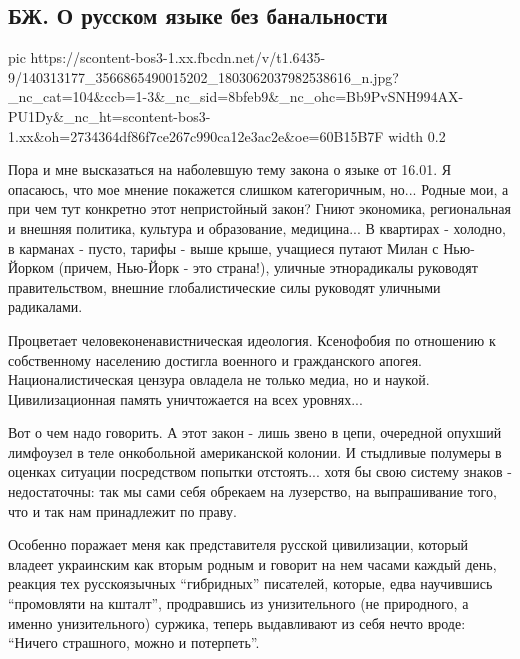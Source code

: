  
 
 
 
 

\subsection{БЖ. О русском языке без банальности}
\label{sec:18_01_2021.fb.bilchenko_evgenia.1.mova_jazyk}

\ifcmt
  pic https://scontent-bos3-1.xx.fbcdn.net/v/t1.6435-9/140313177_3566865490015202_1803062037982538616_n.jpg?_nc_cat=104&ccb=1-3&_nc_sid=8bfeb9&_nc_ohc=Bb9PvSNH994AX-PU1Dy&_nc_ht=scontent-bos3-1.xx&oh=2734364df86f7ce267c990ca12e3ac2e&oe=60B15B7F
	width 0.2
\fi

Пора и мне высказаться на наболевшую тему закона о языке от 16.01. Я опасаюсь,
что мое мнение покажется слишком категоричным, но... Родные мои, а при чем тут
конкретно этот непристойный закон? Гниют экономика, региональная и внешняя
политика, культура и образование, медицина... В квартирах - холодно, в карманах
- пусто, тарифы - выше крыше, учащиеся путают Милан с Нью-Йорком (причем,
Нью-Йорк - это страна!), уличные этнорадикалы руководят правительством, внешние
глобалистические силы руководят уличными радикалами.  

Процветает человеконенавистническая идеология. Ксенофобия по отношению к
собственному населению достигла военного и гражданского апогея.
Националистическая цензура овладела не только медиа, но и наукой.
Цивилизационная память уничтожается на всех уровнях...

Вот о чем надо говорить. А этот закон - лишь звено в цепи, очередной опухший
лимфоузел в теле онкобольной американской колонии. И стыдливые полумеры в
оценках ситуации посредством попытки отстоять... хотя бы свою систему знаков -
недостаточны: так мы сами себя обрекаем на лузерство, на выпрашивание того, что
и так нам принадлежит по праву.

Особенно поражает меня как представителя русской цивилизации, который владеет
украинским как вторым родным и говорит на нем часами каждый день, реакция тех
русскоязычных \enquote{гибридных} писателей, которые, едва научившись \enquote{промовляти на
кшталт},  продравшись из унизительного (не природного, а именно унизительного)
суржика, теперь выдавливают из себя нечто вроде: \enquote{Ничего страшного, можно и
потерпеть}. 

